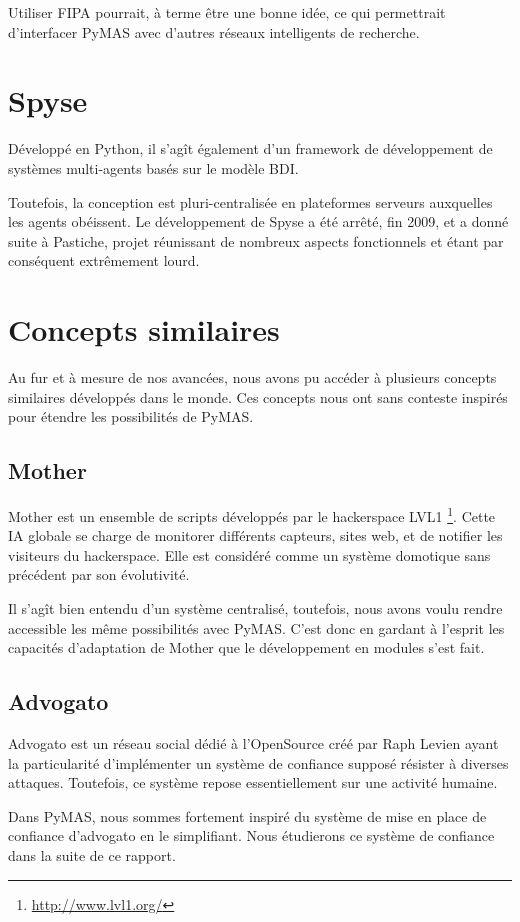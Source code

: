 \documentclass[11pt]{book}
\begin{document}
Utiliser FIPA pourrait, à terme être une bonne idée, ce qui permettrait 
d'interfacer PyMAS avec d'autres réseaux intelligents de recherche.

\section{Spyse}
Développé en Python, il s'agît également d’un framework de développement 
de systèmes multi-agents basés sur le modèle BDI.

Toutefois, la conception est pluri-centralisée en plateformes serveurs 
auxquelles les agents obéissent. Le développement de Spyse a été arrêté, 
fin 2009, et a donné suite à Pastiche, projet réunissant de nombreux 
aspects fonctionnels et étant par conséquent extrêmement lourd.

\section{Concepts similaires}
Au fur et à mesure de nos avancées, nous avons pu accéder à plusieurs 
concepts similaires développés dans le monde. Ces concepts nous ont sans 
conteste inspirés pour étendre les possibilités de PyMAS.

\subsection{Mother}
Mother est un ensemble de scripts développés par le hackerspace LVL1 
\footnote{\url{http://www.lvl1.org/}}. Cette 
IA globale se charge de monitorer différents capteurs, sites web, et de 
notifier les visiteurs du hackerspace. Elle est considéré comme un système 
domotique sans précédent par son évolutivité.

Il s'agît bien entendu d'un système centralisé, toutefois, nous avons voulu 
rendre accessible les même possibilités avec PyMAS. C'est donc en gardant à 
l'esprit les capacités d'adaptation de Mother que le développement en modules
s'est fait.

\subsection{Advogato}
Advogato est un réseau social dédié à l'OpenSource créé par Raph Levien ayant 
la particularité d'implémenter un système de confiance supposé résister à 
diverses attaques. \cite{levien1998attack} Toutefois, ce système repose 
essentiellement sur une activité humaine. 

Dans PyMAS, nous sommes fortement inspiré du système de mise en place de 
confiance d'advogato en le simplifiant. Nous étudierons ce système de 
confiance dans la suite de ce rapport.
\end{document}
